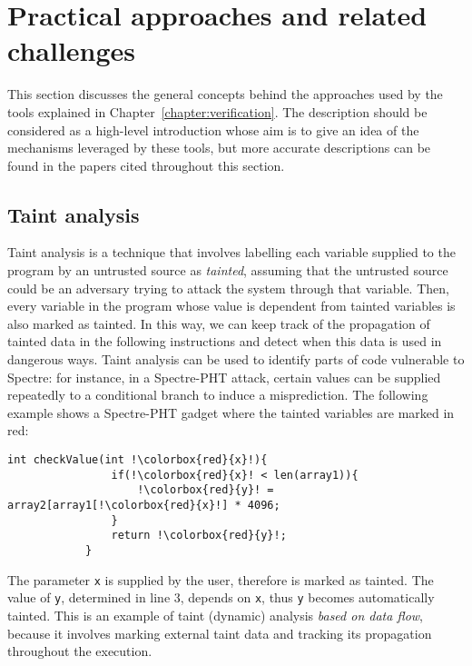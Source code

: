 \documentclass[target=mst,aauheader=aics]{thud}
\theoremstyle{definition}
\begin{document}
	\section{Practical approaches and related challenges}
	This section discusses the general concepts behind the approaches used by the tools explained in Chapter~\ref{chapter:verification}. The description should be considered as a high-level introduction whose aim is to give an idea of the mechanisms leveraged by these tools, but more accurate descriptions can be found in the papers cited throughout this section.
	\subsection{Taint analysis}\label{sec:taint}
	Taint analysis is a technique that involves labelling each variable supplied to the program by an untrusted source as \textit{tainted}, assuming that the untrusted source could be an adversary trying to attack the system  through that variable.
	Then, every variable in the program whose value is dependent from tainted variables is also marked as tainted. In this way, we can keep track of the propagation of tainted data in the following instructions and detect when this data is used in dangerous ways. Taint analysis can be used to identify parts of code vulnerable to Spectre: for instance, in a Spectre-PHT attack, certain values can be supplied repeatedly to a conditional branch to induce a misprediction. The following example shows a Spectre-PHT gadget where the tainted variables are marked in red:
	
	\vspace{3mm}
	\begin{minipage}{.6\textwidth}
		\begin{lstlisting}[escapechar=!]
			int checkValue(int !\colorbox{red}{x}!){
				if(!\colorbox{red}{x}! < len(array1)){
					!\colorbox{red}{y}! = array2[array1[!\colorbox{red}{x}!] * 4096;
				}
				return !\colorbox{red}{y}!;
			}
		\end{lstlisting}
	\end{minipage}
	\vspace{3mm}
	
	The parameter \texttt{x} is supplied by the user, therefore is marked as tainted. The value of \texttt{y}, determined in line 3, depends on \texttt{x}, thus \texttt{y} becomes automatically tainted. This is an example of taint (dynamic) analysis \textit{based on data flow}, because it involves marking external taint data and tracking its propagation throughout the execution.
	
\end{document}

